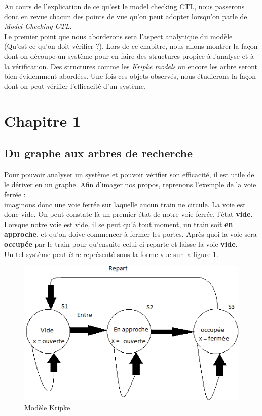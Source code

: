 \documentclass[runningheads,a4paper]{llncs}
\begin{document}
\noindent Au cours de l'explication de ce qu'est le model checking CTL, nous passerons donc en revue chacun des points de vue qu'on peut adopter lorsqu'on parle de \textit{Model Checking CTL}.\\
Le premier point que nous aborderons sera l'aspect analytique du modèle (Qu'est-ce qu'on doit vérifier ?). Lors de ce chapitre, nous allons montrer la façon dont on découpe un système pour en faire des structures propice à l'analyse et à la vérification. Des structures comme les \textit{Kripke models} ou encore les arbre seront bien évidemment abordées. Une fois ces objets observés, nous étudierons la façon dont on peut vérifier l'efficacité d'un système.


\section{Chapitre 1}
\subsection{Du graphe aux arbres de recherche}

Pour pouvoir analyser un système et pouvoir vérifier son efficacité, il est utile de le dériver en un graphe. Afin d'imager nos propos, reprenons l'exemple de la voie ferrée :\\ imaginons donc une voie ferrée sur laquelle aucun train ne circule. La voie est donc vide. On peut constate là un premier état de notre voie ferrée, l'état \textbf{vide}. Lorsque notre voie est vide, il se peut qu'à tout moment, un train soit \textbf{en approche}, et qu'on doive commencer à fermer les portes. Après quoi la voie sera \textbf{occupée} par le train pour qu'ensuite celui-ci reparte et laisse la voie \textbf{vide}.\\

\noindent Un tel système peut être représenté sous la forme vue sur la figure  \ref{label-image3}.

\begin{figure}[!h]
	\includegraphics[scale=0.5]{graphe.png}
	\centering
	\caption{Modèle Kripke}
	\label{label-image3}
\end{figure}
\end{document}
